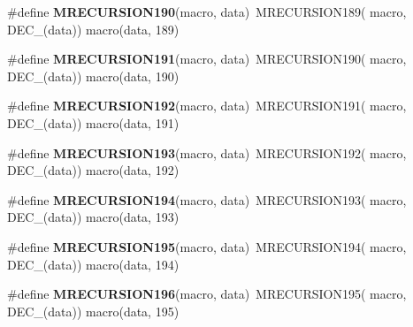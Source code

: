 \begin{DoxyCompactItemize}
\item 
\hypertarget{group__group__sam0__utils__mrecursion_gae01f94ced8dcefc1af77936aec9b55a7}{}\#define {\bfseries M\+R\+E\+C\+U\+R\+S\+I\+O\+N190}(macro,  data)~M\+R\+E\+C\+U\+R\+S\+I\+O\+N189(  macro, D\+E\+C\+\_\+(data))   macro(data, 189)\label{group__group__sam0__utils__mrecursion_gae01f94ced8dcefc1af77936aec9b55a7}

\item 
\hypertarget{group__group__sam0__utils__mrecursion_ga6932bbd13a4e01b7042880a747a2f031}{}\#define {\bfseries M\+R\+E\+C\+U\+R\+S\+I\+O\+N191}(macro,  data)~M\+R\+E\+C\+U\+R\+S\+I\+O\+N190(  macro, D\+E\+C\+\_\+(data))   macro(data, 190)\label{group__group__sam0__utils__mrecursion_ga6932bbd13a4e01b7042880a747a2f031}

\item 
\hypertarget{group__group__sam0__utils__mrecursion_ga51b19514621a674f7708f6b0636ad2be}{}\#define {\bfseries M\+R\+E\+C\+U\+R\+S\+I\+O\+N192}(macro,  data)~M\+R\+E\+C\+U\+R\+S\+I\+O\+N191(  macro, D\+E\+C\+\_\+(data))   macro(data, 191)\label{group__group__sam0__utils__mrecursion_ga51b19514621a674f7708f6b0636ad2be}

\item 
\hypertarget{group__group__sam0__utils__mrecursion_ga646ecde91e6819ac487b0b8f7bc6a7c1}{}\#define {\bfseries M\+R\+E\+C\+U\+R\+S\+I\+O\+N193}(macro,  data)~M\+R\+E\+C\+U\+R\+S\+I\+O\+N192(  macro, D\+E\+C\+\_\+(data))   macro(data, 192)\label{group__group__sam0__utils__mrecursion_ga646ecde91e6819ac487b0b8f7bc6a7c1}

\item 
\hypertarget{group__group__sam0__utils__mrecursion_ga68e422a9d4d85b27a7c8b4fb415266d4}{}\#define {\bfseries M\+R\+E\+C\+U\+R\+S\+I\+O\+N194}(macro,  data)~M\+R\+E\+C\+U\+R\+S\+I\+O\+N193(  macro, D\+E\+C\+\_\+(data))   macro(data, 193)\label{group__group__sam0__utils__mrecursion_ga68e422a9d4d85b27a7c8b4fb415266d4}

\item 
\hypertarget{group__group__sam0__utils__mrecursion_ga4f360a4ac5882dfa8c9c2ce94e1bf496}{}\#define {\bfseries M\+R\+E\+C\+U\+R\+S\+I\+O\+N195}(macro,  data)~M\+R\+E\+C\+U\+R\+S\+I\+O\+N194(  macro, D\+E\+C\+\_\+(data))   macro(data, 194)\label{group__group__sam0__utils__mrecursion_ga4f360a4ac5882dfa8c9c2ce94e1bf496}

\item 
\hypertarget{group__group__sam0__utils__mrecursion_gad4a12ea05cb3470468f67b26d9459f8f}{}\#define {\bfseries M\+R\+E\+C\+U\+R\+S\+I\+O\+N196}(macro,  data)~M\+R\+E\+C\+U\+R\+S\+I\+O\+N195(  macro, D\+E\+C\+\_\+(data))   macro(data, 195)\label{group__group__sam0__utils__mrecursion_gad4a12ea05cb3470468f67b26d9459f8f}


\end{DoxyCompactItemize}
